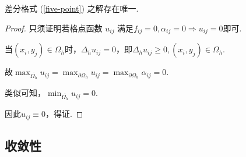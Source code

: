 \begin{theorem}[]
    差分格式 (\ref{five-point}) 之解存在唯一.
\end{theorem}
\begin{proof}
    只须证明若格点函数 $u_{ij}$ 满足$f_{ij}=0,\alpha_{ij}=0\Rightarrow u_{ij}=0$即可.\par
    当$(x_i,y_j)\in\Omega_h$时，$\Delta_h u_{ij}=0$，即$\Delta_h u_{ij}\geq 0,(x_i,y_j)\in \Omega_h$.\par
    故$\max_{\overline{\Omega_h}}u_{ij}=\max_{\partial\Omega_h}{u_{ij}}=\max_{\partial\Omega_h}\alpha_{ij}=0$.\par
    类似可知，$\min_{\overline{\Omega_h}}{u_{ij}}=0$.\par
    因此$u_{ij}\equiv 0$，得证.
\end{proof}

\subsection{收敛性}

